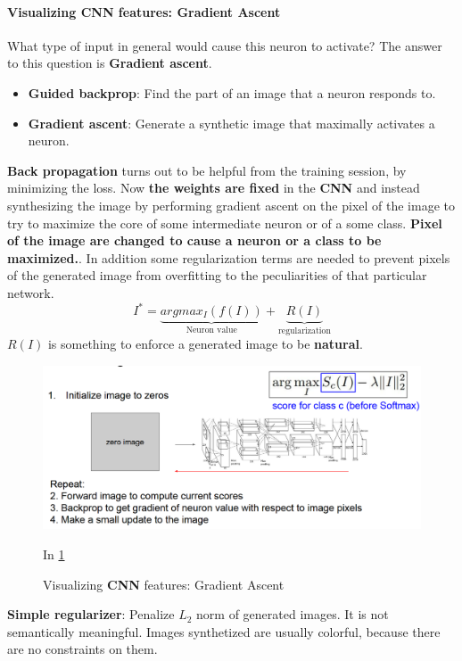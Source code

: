 \documentclass[11pt]{article}
\begin{document}
\paragraph{Visualizing CNN features: Gradient Ascent}
What type of input in general would cause this neuron to activate? The answer to this question is \textbf{Gradient ascent}.
\begin{multicols}{2}
\begin{itemize}
    \item \textbf{Guided backprop}: Find the part of an image that a neuron responds to.
    \item \textbf{Gradient ascent}: Generate a synthetic image that maximally activates a neuron.
\end{itemize}{}
\end{multicols}{}
\textbf{Back propagation} turns out to be helpful from the training session, by minimizing the loss. Now\textbf{ the weights are fixed} in the \textbf{CNN} and instead synthesizing the image by performing gradient ascent on the pixel of the image to try to maximize the core of some intermediate neuron or of a some class. \textbf{Pixel of the image are changed to cause a neuron or a class to be maximized.}. In addition some regularization terms are needed to prevent pixels of the generated image from overfitting to the peculiarities of that particular network.
\begin{equation}
    {I}^*= \underbrace{argmax_I (f(I))}_\text{Neuron value} + \underbrace{R(I)}_\text{regularization}
\end{equation}{}
$R(I)$ is something to enforce a generated image to be \textbf{natural}.
\begin{figure}[h]
\centering
\captionsetup{justification=centering}
\includegraphics[width=0.81\linewidth]{L1114.pdf}
\caption{ Visualizing \textbf{CNN} features: Gradient Ascent}
\label{fig:L1114}
In \ref{fig:L1114}
\end{figure}
\textbf{Simple regularizer}: Penalize $L_2$ norm of generated images. It is not semantically meaningful. Images synthetized are usually colorful, because there are no constraints on them.
\end{document}
